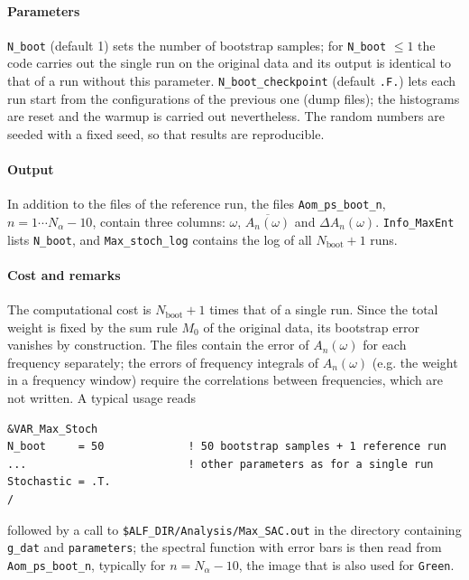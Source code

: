 \paragraph*{Parameters}
\texttt{N\_boot} (default 1)  sets the number of  bootstrap  samples;  for \texttt{N\_boot} $\le 1$  the code  carries out the  single run on the original data
and its output is  identical to that of a run without this  parameter.   \texttt{N\_boot\_checkpoint} (default \texttt{.F.})   lets each run start from the
configurations of the previous one (dump files);  the  histograms are reset and the warmup is  carried out nevertheless.
The random numbers are  seeded  with  a fixed  seed,  so that  results  are reproducible.

\paragraph*{Output}
In  addition to the files of the reference  run, the  files \texttt{Aom\_ps\_boot\_n},  $n = 1 \cdots N_{\alpha}-10$, contain three columns:
$\omega$,  $\overline{A_n(\omega)}$  and $\Delta A_n(\omega)$.  \texttt{Info\_MaxEnt}  lists \texttt{N\_boot},  and  \texttt{Max\_stoch\_log} contains the log of all
$N_{\mathrm{boot}}+1$ runs.

\paragraph*{Cost and remarks}
The  computational cost is  $N_{\mathrm{boot}}+1$  times that  of a single  run.    Since  the total  weight is  fixed by the sum rule $M_0$  of the original data,
its  bootstrap error  vanishes  by  construction.    The files contain the error  of $A_n(\omega)$  for each  frequency separately;  the  errors  of  frequency
integrals  of $A_n(\omega)$ (e.g. the weight in a frequency window)  require the correlations between  frequencies, which  are not  written.
A  typical usage  reads
\begin{verbatim}
&VAR_Max_Stoch
N_boot     = 50             ! 50 bootstrap samples + 1 reference run
...                         ! other parameters as for a single run
Stochastic = .T.
/
\end{verbatim}
followed  by  a  call to \texttt{\$ALF\_DIR/Analysis/Max\_SAC.out}  in the directory  containing \texttt{g\_dat}  and  \texttt{parameters};  the  spectral function
with  error bars is then  read  from \texttt{Aom\_ps\_boot\_n}, typically for  $n = N_\alpha - 10$, the image  that  is also used for  \texttt{Green}.

